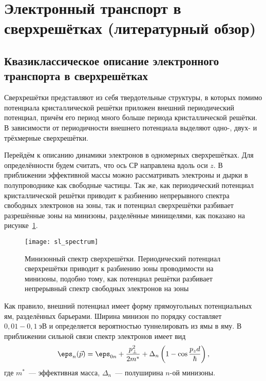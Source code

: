 \section{Электронный транспорт в сверхрешётках (литературный обзор)}
\subsection{Квазиклассическое описание электронного транспорта в сверхрешётках}
Сверхрешётки представляют из себя твердотельные структуры, в которых помимо потенциала кристаллической решётки приложен внешний периодический потенциал, причём его период много больше периода кристаллической решётки. В зависимости от периодичности внешнего потенциала выделяют одно-, двух- и трёхмерные сверхрешётки.

Перейдём к описанию динамики электронов в одномерных сверхрешётках. Для определённости будем считать, что ось СР направлена вдоль оси \( z \). В приближении эффективной массы можно рассматривать электроны и дырки в полупроводнике как свободные частицы. Так же, как периодический потенциал кристаллической решётки приводит к разбиению непрерывного спектра свободных электронов на зоны, так и потенциал сверхрешётки разбивает разрешённые зоны на минизоны, разделённые минищелями, как показано на рисунке~\ref{fig:sl_spectrum}.
\begin{figure}[ht]
  \center
  \texttt{[image: sl\_spectrum]}
  \caption{Минизонный спектр сверхрешётки. Периодический потенциал сверхрешётки приводит к разбиению зоны проводимости на минизоны, подобно тому, как потенциал решётки разбивает непрерывный спектр свободных электронов на зоны}
  \label{fig:sl_spectrum}
\end{figure}
Как правило, внешний потенциал имеет форму прямоугольных потенциальных ям, разделённых барьерами. Ширина минизон по порядку составляет \( 0,\!01 - 0,\!1~\text{эВ} \) и определяется вероятностью туннелировать из ямы в яму. В приближении сильной связи спектр электронов имеет вид
\begin{equation}
  \eps_{n}(\vec{p}) = \eps_{0n} + \frac{p_\perp^2}{2m^*} + \Delta_n \left( 1 - \cos\frac{p_z d}{\hbar} \right),
  \label{eq:sl_disp}
\end{equation}
где \( m^* \)~--- эффективная масса, \( \Delta_n \)~--- полуширина \( n \)-ой минизоны.

